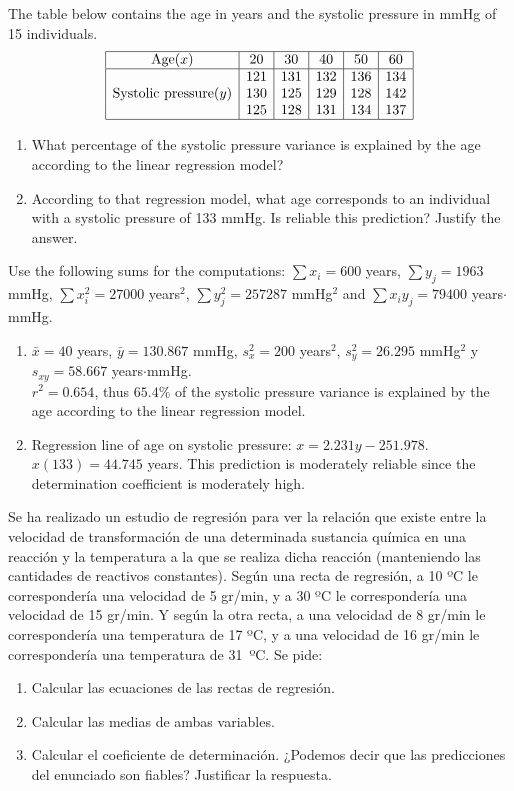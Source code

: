 {The table below contains the age in years and the systolic pressure in mmHg of 15 individuals.
\[
\begin{array}{|c|c|c|c|c|c|}
\hline
\text{Age} (x) & 20 & 30 & 40 & 50 & 60 \\
\hline
& 121 & 131 & 132 & 136 & 134\\
\text{Systolic pressure} (y) & 130 & 125 & 129 & 128 & 142 \\
& 125 & 128 & 131 & 134 & 137\\
\hline
\end{array}
\]

\begin{enumerate}
\item What percentage of the systolic pressure variance is explained by the age according to the linear regression model?
\item According to that regression model, what age corresponds to an individual with a systolic pressure of 133 mmHg.
Is reliable this prediction? 
Justify the answer. 
\end{enumerate}
Use the following sums for the computations:
$\sum x_i=600$ years, $\sum y_j=1963$ mmHg, $\sum x_i^2=27000$ years$^2$, $\sum y_j^2=257287$ mmHg$^2$ and $\sum x_iy_j=79400$ years$\cdot$mmHg.
}
{
\begin{enumerate}
\item $\bar x=40$ years, $\bar y=130.867$ mmHg, $s_x^2=200$ years$^2$, $s_y^2=26.295$ mmHg$^2$ y $s_{xy}=58.667$
years$\cdot$mmHg.\\
$r^2=0.654$, thus $65.4\%$ of the systolic pressure variance is explained by the age according to the linear regression model.
\item Regression line of age on systolic pressure: $x=2.231y-251.978$.\\
$x(133)=44.745$ years. This prediction is moderately reliable since the determination coefficient is moderately high. 
\end{enumerate}
}
{}


{Se ha realizado un estudio de regresión para ver la relación que existe entre la velocidad de transformación de una determinada sustancia química en una reacción y la temperatura a la que se realiza dicha reacción (manteniendo las cantidades de reactivos constantes).
Según una recta de regresión, a 10 ºC le correspondería una velocidad de 5 gr/min, y a 30 ºC le correspondería una velocidad de 15 gr/min.
Y según la otra recta, a una velocidad de 8 gr/min le correspondería una temperatura de 17 ºC, y a una velocidad de 16 gr/min le correspondería una temperatura de \mbox{31 ºC}. Se pide:
\begin{enumerate}
\item Calcular las ecuaciones de las rectas de regresión.
\item Calcular las medias de ambas variables.
\item Calcular el coeficiente de determinación. ¿Podemos decir que las predicciones del enunciado son fiables? Justificar la respuesta.
\end{enumerate}
}
{}
{}


